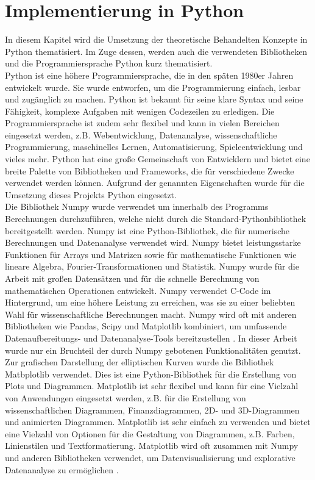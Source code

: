 \chapter{Implementierung in Python}\label{sec:python}
In diesem Kapitel wird die Umsetzung der theoretische Behandelten Konzepte in Python thematisiert. Im Zuge dessen, werden auch die verwendeten Bibliotheken und die Programmiersprache Python kurz thematisiert.\\

Python ist eine höhere Programmiersprache, die in den späten 1980er Jahren entwickelt wurde. Sie wurde entworfen, um die Programmierung einfach, lesbar und zugänglich zu machen. Python ist bekannt für seine klare Syntax und seine Fähigkeit, komplexe Aufgaben mit wenigen Codezeilen zu erledigen. Die Programmiersprache ist zudem sehr flexibel und kann in vielen Bereichen eingesetzt werden, z.B. Webentwicklung, Datenanalyse, wissenschaftliche Programmierung, maschinelles Lernen, Automatisierung, Spieleentwicklung und vieles mehr. Python hat eine große Gemeinschaft von Entwicklern und bietet eine breite Palette von Bibliotheken und Frameworks, die für verschiedene Zwecke verwendet werden können\cite{GuidovanRossum.28.04.2023}. Aufgrund der genannten Eigenschaften wurde für die Umsetzung dieses Projekts Python eingesetzt.\\

Die Bibliothek Numpy wurde verwendet um innerhalb des Programms Berechnungen durchzuführen, welche nicht durch die Standard-Pythonbibliothek bereitgestellt werden. Numpy ist eine Python-Bibliothek, die für numerische Berechnungen und Datenanalyse verwendet wird. Numpy bietet leistungsstarke Funktionen für Arrays und Matrizen sowie für mathematische Funktionen wie lineare Algebra, Fourier-Transformationen und Statistik. Numpy wurde für die Arbeit mit großen Datensätzen und für die schnelle Berechnung von mathematischen Operationen entwickelt. Numpy verwendet C-Code im Hintergrund, um eine höhere Leistung zu erreichen, was sie zu einer beliebten Wahl für wissenschaftliche Berechnungen macht. Numpy wird oft mit anderen Bibliotheken wie Pandas, Scipy und Matplotlib kombiniert, um umfassende Datenaufbereitungs- und Datenanalyse-Tools bereitzustellen \cite{TravisE.Oliphant.o.J.}. In dieser Arbeit wurde nur ein Bruchteil der durch Numpy gebotenen Funktionalitäten genutzt.\\

Zur grafischen Darstellung der elliptischen Kurven wurde die Bibliothek Matbplotlib verwendet. Dies ist eine Python-Bibliothek für die Erstellung von Plots und Diagrammen. Matplotlib ist sehr flexibel und kann für eine Vielzahl von Anwendungen eingesetzt werden, z.B. für die Erstellung von wissenschaftlichen Diagrammen, Finanzdiagrammen, 2D- und 3D-Diagrammen und animierten Diagrammen. Matplotlib ist sehr einfach zu verwenden und bietet eine Vielzahl von Optionen für die Gestaltung von Diagrammen, z.B. Farben, Linienstilen und Textformatierung. Matplotlib wird oft zusammen mit Numpy und anderen Bibliotheken verwendet, um Datenvisualisierung und explorative Datenanalyse zu ermöglichen \cite{JohnD.Hunter.2007}.

